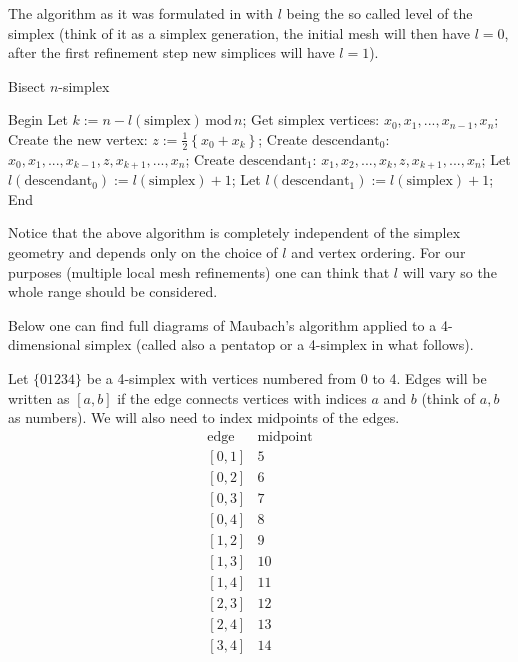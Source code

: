 \documentclass[a4paper,12pt]{amsart}
\numberwithin{equation}{section}
\begin{document}
The algorithm as it was formulated in \cite{maubach} with $l$ being the so called level of the simplex (think of it as a simplex generation, the initial mesh will then have $l = 0$, after the first refinement step new simplices will have $l = 1$).
\begin{algorithm}
    \caption{Bisect $n$-simplex}
    \label{euclid}
    \begin{algorithmic}[1] %
            \State Begin
            \State Let $k:= n - l(\mbox{simplex}) \, \mbox{mod} \, n$;
            \State Get simplex vertices: $x_0, x_1, ..., x_{n-1}, x_n$;
            \State Create the new vertex: $z := \frac{1}{2} \left\{ x_0 + x_k \right\}$;
            \State Create $\mbox{descendant}_0$: $x_0, x_1, ..., x_{k-1}, z, x_{k+1}, ..., x_n$;
            \State Create $\mbox{descendant}_1$: $x_1, x_2, ..., x_k, z, x_{k+1}, ..., x_n$;
            \State Let $l(\mbox{descendant}_0) := l(\mbox{simplex}) + 1$;
            \State Let $l(\mbox{descendant}_1) := l(\mbox{simplex}) + 1$;
            \State End
    \end{algorithmic}
\end{algorithm}
Notice that the above algorithm is completely independent of the simplex geometry and depends only on the choice of $l$ and vertex ordering. For our purposes (multiple local mesh refinements) one can think that $l$ will vary so the whole range should be considered.

Below one can find full diagrams of Maubach's algorithm applied to a 4-dimensional simplex (called also a pentatop or a 4-simplex in what follows).

Let $\{01234\}$ be a 4-simplex with vertices numbered from 0 to 4. Edges will be written as $[a,b]$ if the edge connects vertices with indices $a$ and $b$ (think of $a,b$ as numbers).
We will also need to index midpoints of the edges. 
$$
\begin{array}{cc}
\mbox{edge} & \mbox{midpoint} \\
\left[0,1\right] & 5 \\
\left[0,2\right] & 6 \\
\left[0,3\right] & 7 \\
\left[0,4\right] & 8 \\
\left[1,2\right] & 9 \\
\left[1,3\right] & 10 \\
\left[1,4\right] & 11 \\
\left[2,3\right] & 12 \\
\left[2,4\right] & 13 \\
\left[3,4\right] & 14 \\
\end{array}
$$
\end{document}
